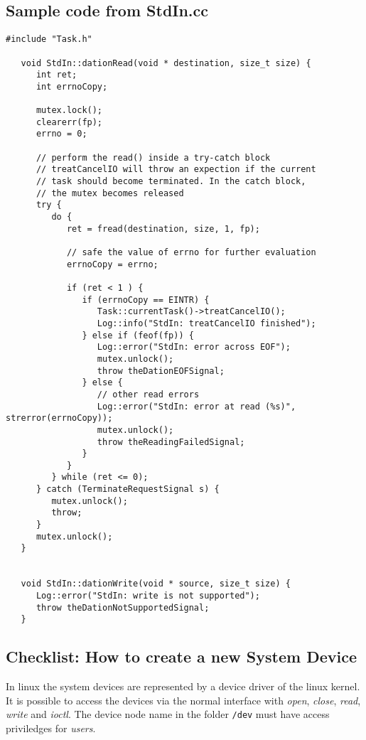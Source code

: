 \subsection{Sample code from StdIn.cc}
\begin{verbatim}
#include "Task.h"

   void StdIn::dationRead(void * destination, size_t size) {
      int ret;
      int errnoCopy;

      mutex.lock();
      clearerr(fp);
      errno = 0;

      // perform the read() inside a try-catch block
      // treatCancelIO will throw an expection if the current
      // task should become terminated. In the catch block,
      // the mutex becomes released
      try {
         do {
            ret = fread(destination, size, 1, fp);

            // safe the value of errno for further evaluation
            errnoCopy = errno;

            if (ret < 1 ) {
               if (errnoCopy == EINTR) {
                  Task::currentTask()->treatCancelIO();
                  Log::info("StdIn: treatCancelIO finished");
               } else if (feof(fp)) {
                  Log::error("StdIn: error across EOF");
                  mutex.unlock();
                  throw theDationEOFSignal;
               } else {
                  // other read errors
                  Log::error("StdIn: error at read (%s)", strerror(errnoCopy));
                  mutex.unlock();
                  throw theReadingFailedSignal;
               }
            }
         } while (ret <= 0);
      } catch (TerminateRequestSignal s) {
         mutex.unlock();
         throw;
      }
      mutex.unlock();
   }


   void StdIn::dationWrite(void * source, size_t size) {
      Log::error("StdIn: write is not supported");
      throw theDationNotSupportedSignal;
   }
\end{verbatim}


\subsection{Checklist: How to create a new System Device}
In linux the system devices are represented by a device driver of
the linux kernel.
It is possible to access the devices via the normal interface
with {\em open}, {\em close}, {\em read}, {\em write} and {\em ioctl}.
The device node name in the folder \verb|/dev| must have access
priviledges for {\em users}.

